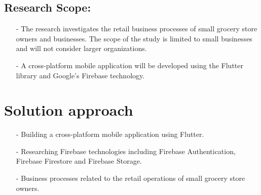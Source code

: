 \documentclass[../thesis.tex]{subfiles}
\begin{document}
\subsection{Research Scope:}
\begin{itemize}
    \item[-] The research investigates the retail business processes of small grocery store owners and businesses. The scope of the study is limited to small businesses and will not consider larger organizations.
    \item[-] A cross-platform mobile application will be developed using the Flutter library and Google's Firebase technology.
\end{itemize}

\section{Solution approach}
\begin{itemize}
    \item[-] Building a cross-platform mobile application using Flutter.
    \item[-] Researching Firebase technologies including Firebase Authentication, Firebase Firestore and Firebase Storage.
    \item[-] Business processes related to the retail operations of small grocery store owners.
\end{itemize}
\end{document}
